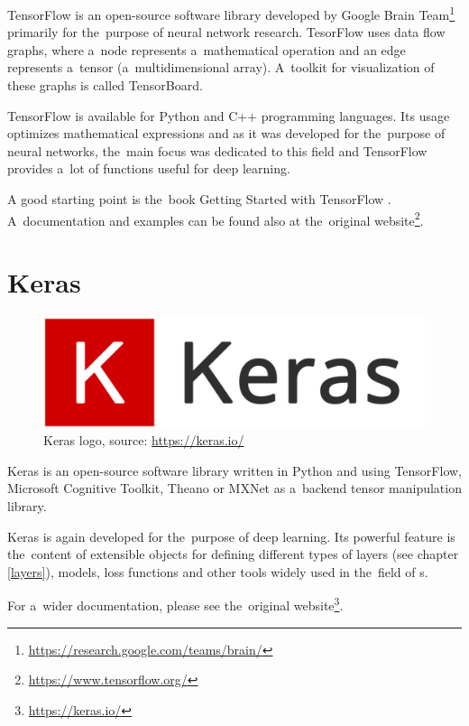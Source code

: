TensorFlow is an open-source software library developed by Google Brain 
Team\footnote{\url{https://research.google.com/teams/brain/}} primarily for
the~purpose of neural network research. TesorFlow uses data flow graphs, where
a~node represents a~mathematical operation and an edge represents a~tensor
(a~multidimensional array). A~toolkit for visualization of these graphs is called 
TensorBoard.

TensorFlow is available for Python and C++ programming languages. Its usage 
optimizes mathematical expressions and as it was developed for the~purpose of 
neural networks, the~main focus was dedicated to this field and TensorFlow 
provides a~lot of functions useful for deep learning.

A good starting point is the~book Getting Started with TensorFlow \cite{tf}.
A~documentation and examples can be found also at the~original 
website\footnote{\url{https://www.tensorflow.org/}}.

\section{Keras}
\label{keras}

\begin{figure}[H]
   \centering
	\includegraphics[width=\linewidth]{./pictures/keras-logo.png}
	\caption[Keras logo]{Keras logo, source: \url{https://keras.io/}}
      \label{fig:keras-logo}
\end{figure}

Keras is an open-source software library written in Python and using TensorFlow, 
Microsoft Cognitive Toolkit, Theano or MXNet as a~backend tensor manipulation 
library.

Keras is again developed for the~purpose of deep learning. Its powerful feature 
is the~content of extensible objects for defining different types of layers (see 
chapter \ref{layers}), models, loss functions and other tools widely used in
the~field of s.

For a~wider documentation, please see the~original 
website\footnote{\url{https://keras.io/}}.
